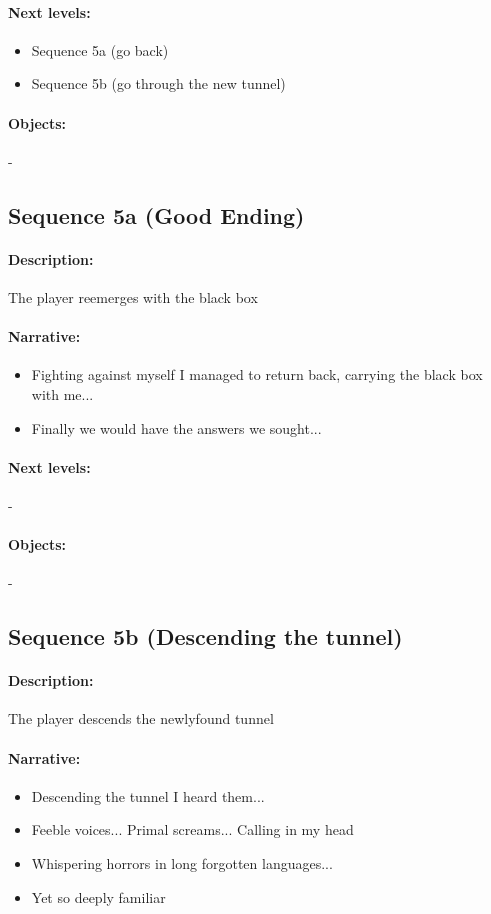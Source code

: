 \documentclass{article}
\begin{document}
\paragraph{Next levels: } 
\begin{itemize}
\item Sequence 5a (go back)
\item Sequence 5b (go through the new tunnel)
\end{itemize}
\paragraph{Objects: } -

\subsection{Sequence 5a (Good Ending)}

\paragraph{Description: } The player reemerges with the black box
\paragraph{Narrative: } 
\begin{itemize}
\item Fighting against myself I managed to return back, carrying the black box with me...
\item Finally we would have the answers we sought...
\end{itemize}
\paragraph{Next levels: } -
\paragraph{Objects: } -



\subsection{Sequence 5b (Descending the tunnel)}

\paragraph{Description: } The player descends the newlyfound tunnel
\paragraph{Narrative: } 
\begin{itemize}
\item Descending the tunnel I heard them...
\item Feeble voices... Primal screams... Calling in my head
\item Whispering horrors in long forgotten languages...
\item Yet so deeply familiar
\end{itemize}
\end{document}
